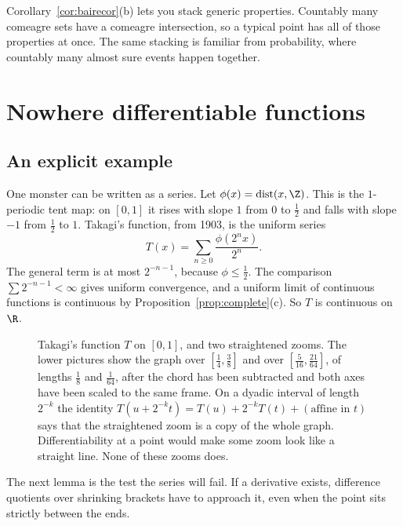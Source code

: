 Corollary~\ref{cor:bairecor}(b) lets you stack generic properties. Countably many comeagre sets have a comeagre intersection, so a typical point has all of those properties at once. The same stacking is familiar from probability, where countably many almost sure events happen together.

\section{Nowhere differentiable functions}

\subsection*{An explicit example}

One monster can be written as a series. Let $\phi(x)=\operatorname{dist}(x,\Z)$. This is the $1$-periodic tent map: on $[0,1]$ it rises with slope $1$ from $0$ to $\frac12$ and falls with slope $-1$ from $\frac12$ to $1$. Takagi's function, from 1903, is the uniform series
\[T(x)=\sum_{n\ge0}\frac{\phi(2^nx)}{2^n}.\]
The general term is at most $2^{-n-1}$, because $\phi\le\frac12$. The comparison $\sum 2^{-n-1}<\infty$ gives uniform convergence, and a uniform limit of continuous functions is continuous by Proposition~\ref{prop:complete}(c). So $T$ is continuous on $\R$.

\begin{figure}[ht]
\centering
{}
\caption{Takagi's function $T$ on $[0,1]$, and two straightened zooms. The lower pictures show the graph over $[\frac14,\frac38]$ and over $[\frac5{16},\frac{21}{64}]$, of lengths $\frac18$ and $\frac1{64}$, after the chord has been subtracted and both axes have been scaled to the same frame. On a dyadic interval of length $2^{-k}$ the identity $T(u+2^{-k}t)=T(u)+2^{-k}T(t)+(\text{affine in }t)$ says that the straightened zoom is a copy of the whole graph. Differentiability at a point would make some zoom look like a straight line. None of these zooms does.}
\label{fig:takagi}
\end{figure}

The next lemma is the test the series will fail. If a derivative exists, difference quotients over shrinking brackets have to approach it, even when the point sits strictly between the ends.

